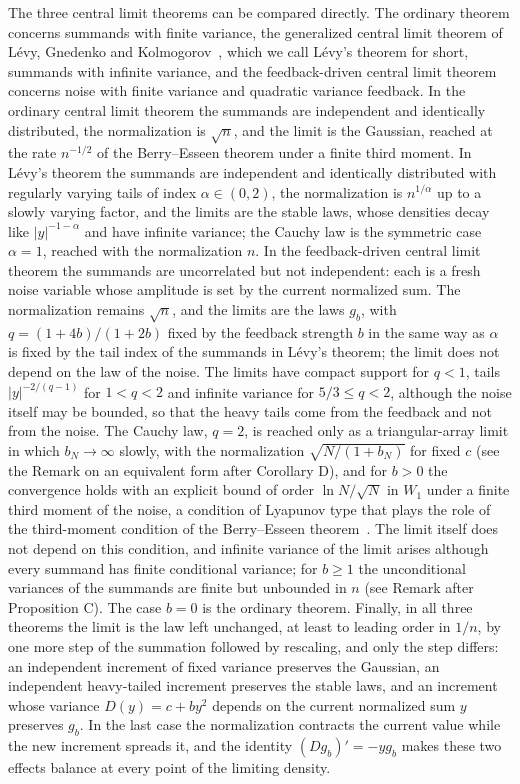 \documentclass[aip,jmp,preprint,onecolumn,floatfix,superscriptaddress,nofootinbib,11pt]{revtex4-2}
\theoremstyle{plain}
\theoremstyle{remark}
\numberwithin{equation}{section}
\begin{document}
The three central limit theorems can be compared directly. The ordinary theorem concerns summands with finite variance, the generalized central limit theorem of L\'evy, Gnedenko and Kolmogorov~\cite{Levy1937,GK}, which we call L\'evy's theorem for short, summands with infinite variance, and the feedback-driven central limit theorem concerns noise with finite variance and quadratic variance feedback. In the ordinary central limit theorem the summands are independent and identically distributed, the normalization is $\sqrt n$, and the limit is the Gaussian, reached at the rate $n^{-1/2}$ of the Berry--Esseen theorem under a finite third moment. In L\'evy's theorem the summands are independent and identically distributed with regularly varying tails of index $\alpha\in(0,2)$, the normalization is $n^{1/\alpha}$ up to a slowly varying factor, and the limits are the stable laws, whose densities decay like $|y|^{-1-\alpha}$ and have infinite variance; the Cauchy law is the symmetric case $\alpha=1$, reached with the normalization $n$. In the feedback-driven central limit theorem the summands are uncorrelated but not independent: each is a fresh noise variable whose amplitude is set by the current normalized sum. The normalization remains $\sqrt n$, and the limits are the laws $g_b$, with $q=(1+4b)/(1+2b)$ fixed by the feedback strength $b$ in the same way as $\alpha$ is fixed by the tail index of the summands in L\'evy's theorem; the limit does not depend on the law of the noise. The limits have compact support for $q<1$, tails $|y|^{-2/(q-1)}$ for $1<q<2$ and infinite variance for $5/3\le q<2$, although the noise itself may be bounded, so that the heavy tails come from the feedback and not from the noise. The Cauchy law, $q=2$, is reached only as a triangular-array limit in which $b_N\to\infty$ slowly, with the normalization $\sqrt{N/(1+b_N)}$ for fixed $c$ (see the Remark on an equivalent form after Corollary D), and for $b>0$ the convergence holds with an explicit bound of order $\ln N/\sqrt N$ in $W_1$ under a finite third moment of the noise, a condition of Lyapunov type that plays the role of the third-moment condition of the Berry--Esseen theorem~\cite{Feller}. The limit itself does not depend on this condition, and infinite variance of the limit arises although every summand has finite conditional variance; for $b\ge1$ the unconditional variances of the summands are finite but unbounded in $n$ (see Remark after Proposition C). The case $b=0$ is the ordinary theorem. Finally, in all three theorems the limit is the law left unchanged, at least to leading order in $1/n$, by one more step of the summation followed by rescaling, and only the step differs: an independent increment of fixed variance preserves the Gaussian, an independent heavy-tailed increment preserves the stable laws, and an increment whose variance $D(y)=c+by^{2}$ depends on the current normalized sum $y$ preserves $g_b$. In the last case the normalization contracts the current value while the new increment spreads it, and the identity $(Dg_b)'=-yg_b$ makes these two effects balance at every point of the limiting density.
\end{document}
